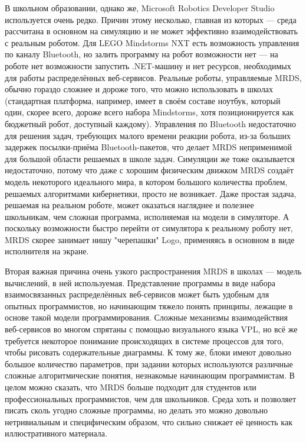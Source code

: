 \documentclass[a4paper]{article}
\begin{document}
В школьном образовании, однако же, Microsoft Robotics Developer Studio используется очень редко. Причин этому несколько, главная из которых --- среда рассчитана в основном на симуляцию и не может эффективно взаимодействовать с реальным роботом. Для LEGO Mindstorms NXT есть возможность управления по каналу Bluetooth, но залить программу на робот возможности нет --- на роботе нет возможности запустить .NET-машину и нет ресурсов, необходимых для работы распределённых веб-сервисов. Реальные роботы, управляемые MRDS, обычно гораздо сложнее и дороже того, что можно использовать в школах (стандартная платформа, например, имеет в своём составе ноутбук, который один, скорее всего, дороже всего набора Mindstorms, хотя позиционируется как бюджетный робот, доступный каждому). Управления по Bluetooth недостаточно для решения задач, требующих малого времени реакции робота, из-за больших задержек посылки-приёма Bluetooth-пакетов, что делает MRDS неприменимой для большой области решаемых в школе задач. Симуляции же тоже оказывается недостаточно, потому что даже с хорошим физическим движком MRDS создаёт модель некоторого идеального мира, в котором большого количества проблем, решаемых алгоритмами кибернетики, просто не возникает. Даже простая задача, решаемая на реальном роботе, может оказаться нагляднее и полезнее школьникам, чем сложная программа, исполняемая на модели в симуляторе. А поскольку возможности быстро перейти от симулятора к реальному роботу нет, MRDS скорее занимает нишу "черепашки" Logo, применяясь в основном в виде исполнителя на экране.

Вторая важная причина очень узкого распространения MRDS в школах --- модель вычислений, в ней используемая. Представление программы в виде набора взаимосвязанных распределённых веб-сервисов может быть удобным для опытных программистов, но начинающим тяжело понять принципы, лежащие в основе такой модели программирования. Сложные механизмы взаимодействия веб-сервисов во многом спрятаны с помощью визуального языка VPL, но всё же требуется некоторое понимание происходящих в системе процессов для того, чтобы рисовать содержательные диаграммы. К тому же, блоки имеют довольно большое количество параметров, при задании которых используются различные сложные алгоритмические понятия, незнакомые начинающим программистам. В целом можно сказать, что MRDS больше подходит для студентов или профессиональных программистов, чем для школьников. Среда хоть и позволяет писать сколь угодно сложные программы, но делать это можно довольно нетривиальным и специфическим образом, что сильно снижает её ценность как иллюстративного материала.
\end{document}
